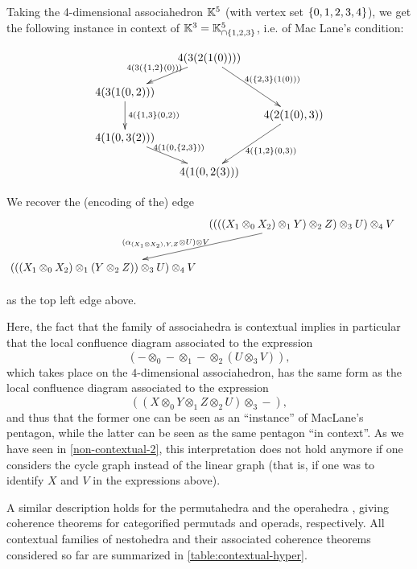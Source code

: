 \begin{example}
Taking the 4-dimensional associahedron ${\mathbb K}^5$ (with vertex set $\left\{0,1,2,3,4\right\}$), we get the following instance in context of ${\mathbb K}^3={\mathbb K}^5_{\cap \left\{1,2,3\right\}}$, i.e. of Mac Lane's condition:
\begin{center}
$$\xymatrix @-1.65pc {&& 4(3(2(1(0)))) \ar @{->}[ddll]_{4(3(\set{1,2}(0)))} \ar @{->}[dddrr]^{4(\set{2,3}(1(0)))}&& \\
 &&&&\\
4(3(1(0,2)))  \ar @{->}[dd]^{4(\set{1,3}(0,2))}&&   && \\
 &&&&4(2(1(0),3)) \ar @{->}[dddll]^{4(\set{1,2}(0,3))}\\
 4(1(0,3(2))) \ar @{->}[ddrr]^{4(1(0,\set{2,3}))} &  &\\
 &&&&\\
 &&4(1(0,2(3)))&&}$$
\end{center}
We recover the (encoding of the) edge 
 $$
 \xymatrix @-2pc {&& ((((X_1\otimes_0 X_2)\otimes_1 Y)\otimes_2 Z)\otimes_3 U)\otimes_4 V \ar @{->}[dddddll]_(.6){(\alpha_{(X_1\otimes X_2),Y,Z}\otimes U)\otimes V\quad} && \\
 &&&&\\
 &&&&\\
  &&&&\\
    &&&&\\
( ((X_1\otimes_0 X_2)\otimes_1 (Y\otimes_2 Z))\otimes_3 U)\otimes_4 V  &&   && \\
\ }
$$
as the top left edge above.
\end{example}

Here, the fact that the family of associahedra is contextual implies in particular that the local confluence diagram associated to the expression
$$ (-\otimes_0 - \otimes_1 - \otimes_2 (U \otimes_3 V)),$$
which takes place on the $4$-dimensional associahedron, has the same form as the local confluence diagram associated to the expression
$$ ((X \otimes_0 Y \otimes_1 Z \otimes_2 U) \otimes_3 -),$$
and thus that the former one can be seen as an ``instance'' of MacLane's pentagon, while the latter can be seen as the same pentagon ``in context''.
As we have seen in \cref{non-contextual-2}, this interpretation does not hold anymore if one considers the cycle graph instead of the linear graph (that is, if one was to identify $X$ and $V$ in the expressions above). 

A similar description holds for the permutahedra and the operahedra \cite{CLA1}, giving coherence theorems for categorified permutads and operads, respectively. 
All contextual families of nestohedra and their associated coherence theorems considered so far are summarized in \cref{table:contextual-hyper}.

